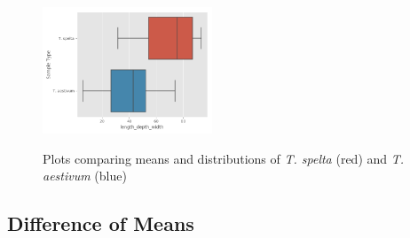 \documentclass[11pt]{report}
\begin{document}
\begin{figure}[!ht]
{    \includegraphics[width=0.45\textwidth]{./images/results/group3/length_depth_width.png}
    }
  \caption{Plots comparing means and distributions of \textit{T. spelta} (red) and \textit{T. aestivum} (blue)}
  \label{fig:dummy}
\end{figure}
\clearpage
\subsection{Difference of Means}
\label{sec:orgdc85402}
\end{document}
